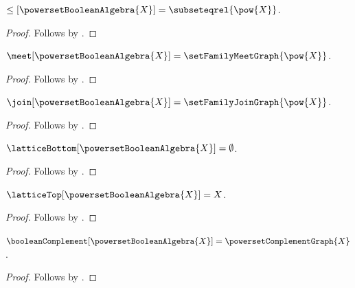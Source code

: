 \begin{proposition}\label{powerset_boolean_algebra_order}
    $\leq[\powersetBooleanAlgebra{X}]=\subseteqrel{\pow{X}}$.
\end{proposition}
\begin{proof}
    Follows by
        .
\end{proof}

\begin{proposition}\label{powerset_boolean_algebra_meet}
    $\meet[\powersetBooleanAlgebra{X}]
        =\setFamilyMeetGraph{\pow{X}}$.
\end{proposition}
\begin{proof}
    Follows by
        .
\end{proof}

\begin{proposition}\label{powerset_boolean_algebra_join}
    $\join[\powersetBooleanAlgebra{X}]
        =\setFamilyJoinGraph{\pow{X}}$.
\end{proposition}
\begin{proof}
    Follows by
        .
\end{proof}

\begin{proposition}\label{powerset_boolean_algebra_bottom}
    $\latticeBottom[\powersetBooleanAlgebra{X}]=\emptyset$.
\end{proposition}
\begin{proof}
    Follows by
        .
\end{proof}

\begin{proposition}\label{powerset_boolean_algebra_top}
    $\latticeTop[\powersetBooleanAlgebra{X}]=X$.
\end{proposition}
\begin{proof}
    Follows by
        .
\end{proof}

\begin{proposition}\label{powerset_boolean_algebra_complement}
    $\booleanComplement[\powersetBooleanAlgebra{X}]
        =\powersetComplementGraph{X}$.
\end{proposition}
\begin{proof}
    Follows by
        .
\end{proof}

